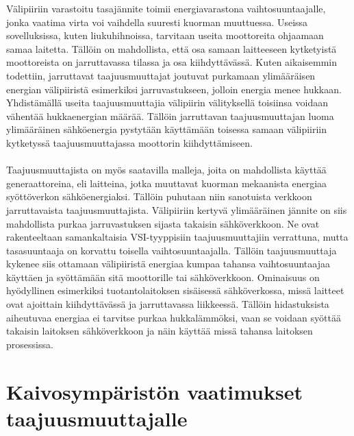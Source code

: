 \documentclass[finnish,12pt,a4paper,pdftex,elec,utf8]{aaltothesis}
\begin{document}
\noindent
Välipiiriin varastoitu tasajännite toimii energiavarastona vaihtosuuntaajalle, jonka vaatima virta voi vaihdella suuresti kuorman muuttuessa. Useissa sovelluksissa, kuten liukuhihnoissa, tarvitaan useita moottoreita ohjaamaan samaa laitetta. Tällöin on mahdollista, että osa samaan laitteeseen kytketyistä moottoreista on jarruttavassa tilassa ja osa kiihdyttävässä. Kuten aikaisemmin todettiin, jarruttavat taajuusmuuttajat joutuvat purkamaan ylimääräisen energian välipiiristä esimerkiksi jarruvastukseen, jolloin energia menee hukkaan. Yhdistämällä useita taajuusmuuttajia välipiirin välityksellä toisiinsa voidaan vähentää hukkaenergian määrää. Tällöin jarruttavan taajuusmuuttajan luoma ylimääräinen sähköenergia pystytään käyttämään toisessa samaan välipiiriin kytketyssä taajuusmuuttajassa moottorin kiihdyttämiseen.
\\\\
Taajuusmuuttajista on myös saatavilla malleja, joita on mahdollista käyttää generaattoreina, eli laitteina, jotka muuttavat kuorman mekaanista energiaa syöttöverkon sähköenergiaksi. Tällöin puhutaan niin sanotuista verkkoon jarruttavaista taajuusmuuttajista. Välipiiriin kertyvä ylimääräinen jännite on siis mahdollista purkaa jarruvastuksen sijasta takaisin sähköverkkoon. Ne ovat rakenteeltaan samankaltaisia VSI-tyyppisiin taajuusmuuttajiin verrattuna, mutta tasasuuntaaja on korvattu toisella vaihtosuuntaajalla. Tällöin taajuusmuuttaja kykenee siis ottamaan välipiiristä energiaa kumpaa tahansa vaihtosuuntaajaa käyttäen ja syöttämään sitä moottorille tai sähköverkkoon. Ominaisuus on hyödyllinen esimerkiksi tuotantolaitoksen sisäisessä sähköverkossa, missä laitteet ovat ajoittain kiihdyttävässä ja jarruttavassa liikkeessä. Tällöin hidastuksista aiheutuvaa energiaa ei tarvitse purkaa hukkalämmöksi, vaan se voidaan syöttää takaisin laitoksen sähköverkkoon ja näin käyttää missä tahansa laitoksen prosessissa.




\clearpage

\section{{\large Kaivosympäristön vaatimukset taajuusmuuttajalle}}
\end{document}
